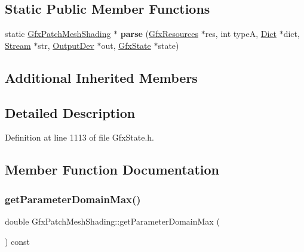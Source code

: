 \subsection*{Static Public Member Functions}
\begin{DoxyCompactItemize}
\item 
\mbox{\label{class_gfx_patch_mesh_shading_abcf3a69f5db2656da8a3c0c91b3ee6c1}} 
static \hyperlink{class_gfx_patch_mesh_shading}{Gfx\+Patch\+Mesh\+Shading} $\ast$ {\bfseries parse} (\hyperlink{class_gfx_resources}{Gfx\+Resources} $\ast$res, int typeA, \hyperlink{class_dict}{Dict} $\ast$dict, \hyperlink{class_stream}{Stream} $\ast$str, \hyperlink{class_output_dev}{Output\+Dev} $\ast$out, \hyperlink{class_gfx_state}{Gfx\+State} $\ast$state)
\end{DoxyCompactItemize}
\subsection*{Additional Inherited Members}


\subsection{Detailed Description}


Definition at line 1113 of file Gfx\+State.\+h.



\subsection{Member Function Documentation}
\mbox{\label{class_gfx_patch_mesh_shading_ac03f7da2444d285f27708d1db5dc2299}} 
\subsubsection{\texorpdfstring{get\+Parameter\+Domain\+Max()}{getParameterDomainMax()}}
{\footnotesize\ttfamily double Gfx\+Patch\+Mesh\+Shading\+::get\+Parameter\+Domain\+Max (\begin{DoxyParamCaption}{ }\end{DoxyParamCaption}) const\hspace{0.3cm}{\ttfamily [inline]}}

